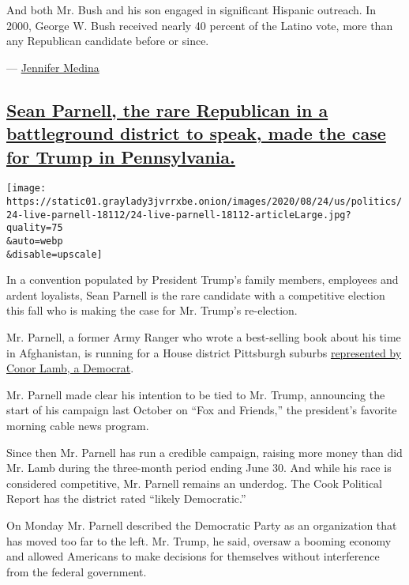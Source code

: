 And both Mr. Bush and his son engaged in significant Hispanic outreach.
In 2000, George W. Bush received nearly 40 percent of the Latino vote,
more than any Republican candidate before or since.

---
\href{https://www.nytimes3xbfgragh.onion/by/jennifer-medina}{Jennifer
Medina}

\hypertarget{sean-parnell-the-rare-republican-in-a-battleground-district-to-speak-made-the-case-for-trump-in-pennsylvania}{%
\subsection{\texorpdfstring{\protect\hyperlink{sean-parnell-the-rare-republican-in-a-battleground-district-to-speak-made-the-case-for-trump-in-pennsylvania}{Sean
Parnell, the rare Republican in a battleground district to speak, made
the case for Trump in
Pennsylvania.}}{Sean Parnell, the rare Republican in a battleground district to speak, made the case for Trump in Pennsylvania.}}\label{sean-parnell-the-rare-republican-in-a-battleground-district-to-speak-made-the-case-for-trump-in-pennsylvania}}

\texttt{[image: https://static01.graylady3jvrrxbe.onion/images/2020/08/24/us/politics/24-live-parnell-18112/24-live-parnell-18112-articleLarge.jpg?quality=75\\\&auto=webp\\\&disable=upscale]}

In a convention populated by President Trump's family members, employees
and ardent loyalists, Sean Parnell is the rare candidate with a
competitive election this fall who is making the case for Mr. Trump's
re-election.

Mr. Parnell, a former Army Ranger who wrote a best-selling book about
his time in Afghanistan, is running for a House district Pittsburgh
suburbs
\href{https://www.nytimes3xbfgragh.onion/2020/08/16/us/politics/joe-biden-conor-lamb-trump.html}{represented
by Conor Lamb, a Democrat}.

Mr. Parnell made clear his intention to be tied to Mr. Trump, announcing
the start of his campaign last October on ``Fox and Friends,'' the
president's favorite morning cable news program.

Since then Mr. Parnell has run a credible campaign, raising more money
than did Mr. Lamb during the three-month period ending June 30. And
while his race is considered competitive, Mr. Parnell remains an
underdog. The Cook Political Report has the district rated ``likely
Democratic.''

On Monday Mr. Parnell described the Democratic Party as an organization
that has moved too far to the left. Mr. Trump, he said, oversaw a
booming economy and allowed Americans to make decisions for themselves
without interference from the federal government.


